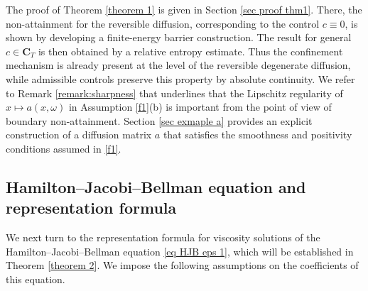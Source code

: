 \documentclass[11pt]{article}
\theoremstyle{rem}
\begin{document}
The proof of Theorem \ref{theorem 1} is given in Section \ref{sec proof thm1}. There, the non-attainment for the reversible diffusion, corresponding to the control
$c\equiv0$, is shown by developing a finite-energy barrier construction. The result for general $c\in\mathbf C_T$ is then obtained by a relative entropy estimate. Thus the confinement mechanism is already present at the level of the reversible degenerate diffusion, while admissible controls preserve this property by absolute continuity. We refer to Remark \ref{remark:sharpness} that underlines that the Lipschitz regularity of $x\mapsto a(x,\omega)$ in Assumption \ref{f1}(b) is important from the point of view of boundary non-attainment. Section \ref{sec exmaple a} provides an explicit construction of a diffusion matrix $a$ that satisfies the smoothness and positivity conditions assumed in \ref{f1}. 


\subsection{Hamilton--Jacobi--Bellman equation and representation formula}\label{sec-HJB}

We next turn to the representation formula for viscosity solutions of the Hamilton--Jacobi--Bellman equation \eqref{eq HJB eps 1}, which will be established in Theorem \ref{theorem 2}. We impose the following assumptions on the coefficients of this equation.
\end{document}
